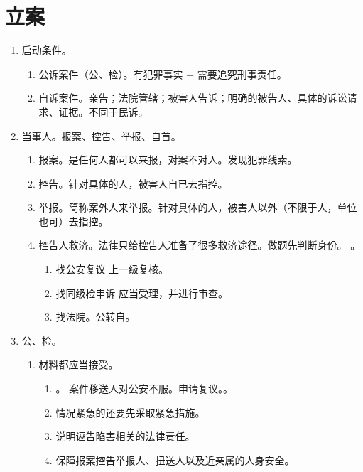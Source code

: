 \section{立案}
\begin{enumerate}
  \item 启动条件。
        \begin{enumerate}
          \item 公诉案件（公、检）。有犯罪事实 + 需要追究刑事责任。
          \item 自诉案件。亲告；法院管辖；被害人告诉；明确的被告人、具体的诉讼请求、证据。不同于民诉。
        \end{enumerate}
  \item 当事人。报案、控告、举报、自首。
        \begin{enumerate}
          \item 报案。是任何人都可以来报，对案不对人。发现犯罪线索。
          \item 控告。针对具体的人，被害人自已去指控。
          \item 举报。简称案外人来举报。针对具体的人，被害人以外（不限于人，单位也可）去指控。
          \item 控告人救济。法律只给控告人准备了很多救济途径。做题先判断身份。
                。
                \begin{enumerate}
                  \item 找公安复议 \yjt 上一级复核。
                  \item 找同级检申诉 \yjt 应当受理，并进行审查。
                  \item 找法院。公转自。
                \end{enumerate}
        \end{enumerate}
  \item 公、检。
        \begin{enumerate}
          \item 材料都应当接受。
                \begin{enumerate}
                  \item {}。
                        案件移送人对公安不服。申请复议。。
                  \item 情况紧急的还要先采取紧急措施。
                  \item 说明诬告陷害相关的法律责任。
                  \item 保障报案控告举报人、扭送人以及近亲属的人身安全。

\end{enumerate}
\end{enumerate}
\end{enumerate}
